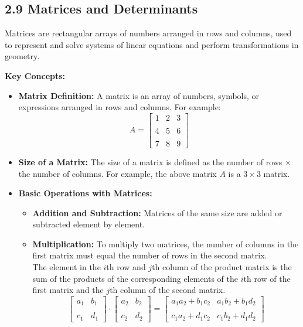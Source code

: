 
\subsection*{2.9 Matrices and Determinants}
Matrices are rectangular arrays of numbers arranged in rows and columns, used to represent and solve systems of linear equations and perform transformations in geometry.

\textbf{Key Concepts:}
\begin{itemize}
    \item \textbf{Matrix Definition:} A matrix is an array of numbers, symbols, or expressions arranged in rows and columns. For example:
    \[
    A = \begin{bmatrix} 1 & 2 & 3 \\\\ 4 & 5 & 6 \\\\ 7 & 8 & 9 \end{bmatrix}
    \]
    \item \textbf{Size of a Matrix:} The size of a matrix is defined as the number of rows $\times$ the number of columns. For example, the above matrix $A$ is a $3 \times 3$ matrix.
    \item \textbf{Basic Operations with Matrices:}
    \begin{itemize}
        \item \textbf{Addition and Subtraction:} Matrices of the same size are added or subtracted element by element.
        \item \textbf{Multiplication:} To multiply two matrices, the number of columns in the first matrix must equal the number of rows in the second matrix. \\
        The element in the $i$th row and $j$th column of the product matrix is the sum of the products of the corresponding elements of the $i$th row of the first matrix and the $j$th column of the second matrix. \\
        \[
\begin{bmatrix} a_1 & b_1 \\\\ c_1 & d_1 \end{bmatrix} \cdot \begin{bmatrix} a_2 & b_2 \\\\ c_2 & d_2 \end{bmatrix} = \begin{bmatrix} a_1a_2 + b_1c_2 & a_1b_2 + b_1d_2 \\\\ c_1a_2 + d_1c_2 & c_1b_2 + d_1d_2 \end{bmatrix}
\]


\end{itemize}
\end{itemize}

